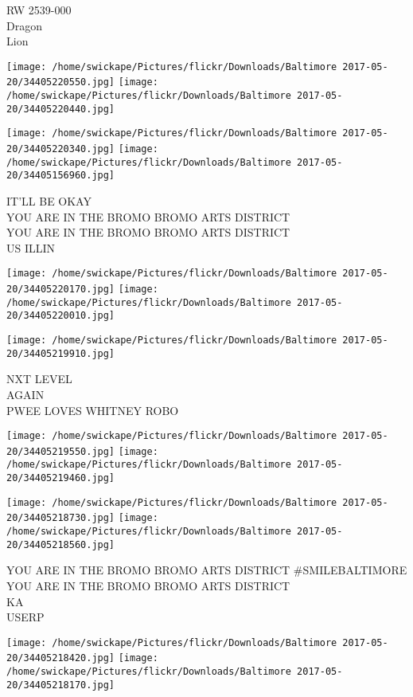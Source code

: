 \documentclass[10pt,letterpaper]{article}
\begin{document}
RW 2539{-}000\\
Dragon\\
Lion
\pagebreak

\texttt{[image: /home/swickape/Pictures/flickr/Downloads/Baltimore 2017-05-20/34405220550.jpg]}
\texttt{[image: /home/swickape/Pictures/flickr/Downloads/Baltimore 2017-05-20/34405220440.jpg]}

\texttt{[image: /home/swickape/Pictures/flickr/Downloads/Baltimore 2017-05-20/34405220340.jpg]}
\texttt{[image: /home/swickape/Pictures/flickr/Downloads/Baltimore 2017-05-20/34405156960.jpg]}

IT'LL BE OKAY\\
YOU ARE IN THE BROMO BROMO ARTS DISTRICT\\
YOU ARE IN THE BROMO BROMO ARTS DISTRICT\\
US ILLIN
\pagebreak

\texttt{[image: /home/swickape/Pictures/flickr/Downloads/Baltimore 2017-05-20/34405220170.jpg]}
\texttt{[image: /home/swickape/Pictures/flickr/Downloads/Baltimore 2017-05-20/34405220010.jpg]}

\vspace{0.25in}
\texttt{[image: /home/swickape/Pictures/flickr/Downloads/Baltimore 2017-05-20/34405219910.jpg]}

NXT LEVEL\\
AGAIN\\
PWEE LOVES WHITNEY ROBO
\pagebreak

\texttt{[image: /home/swickape/Pictures/flickr/Downloads/Baltimore 2017-05-20/34405219550.jpg]}
\texttt{[image: /home/swickape/Pictures/flickr/Downloads/Baltimore 2017-05-20/34405219460.jpg]}

\texttt{[image: /home/swickape/Pictures/flickr/Downloads/Baltimore 2017-05-20/34405218730.jpg]}
\texttt{[image: /home/swickape/Pictures/flickr/Downloads/Baltimore 2017-05-20/34405218560.jpg]}

YOU ARE IN THE BROMO BROMO ARTS DISTRICT \#SMILEBALTIMORE\\
YOU ARE IN THE BROMO BROMO ARTS DISTRICT\\
KA\\
USERP
\pagebreak

\texttt{[image: /home/swickape/Pictures/flickr/Downloads/Baltimore 2017-05-20/34405218420.jpg]}
\texttt{[image: /home/swickape/Pictures/flickr/Downloads/Baltimore 2017-05-20/34405218170.jpg]}
\end{document}
